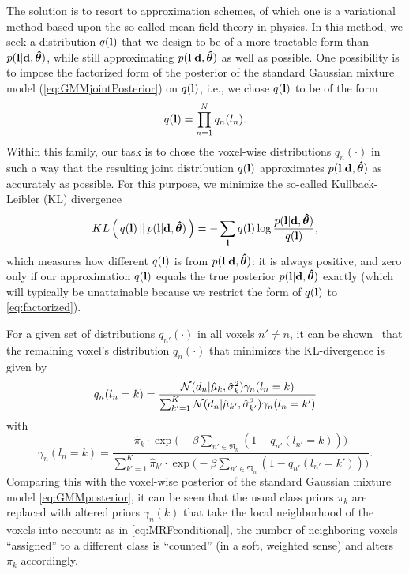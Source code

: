 \documentclass[10pt,twoside]{book}
\begin{document}
The solution is to resort to approximation schemes, of which one is a variational method based upon the so-called mean field theory in physics. In this method, we seek a distribution $q(\mathbf{l})$ that we design to be of a more tractable form than $p(\mathbf{l} | \mathbf{d}, {\mbox{\boldmath {${\hat{\theta}}$}}})$, while still approximating $p(\mathbf{l} | \mathbf{d}, {\mbox{\boldmath {${\hat{\theta}}$}}})$ as well as possible. One possibility is to impose the factorized form of the posterior of the standard Gaussian mixture model (\eqref{eq:GMMjointPosterior}) on $q(\mathbf{l})$, i.e., we chose $q(\mathbf{l})$ to be of the form
\begin{equation}
  q( \mathbf{l} ) = \prod_{n=1}^N q_n( l_n ).
  \label{eq:factorized}
\end{equation}
Within this family, our task is to chose the voxel-wise distributions $q_n(\cdot)$ in such a way that the resulting joint distribution $q(\mathbf{l})$ approximates $p(\mathbf{l} | \mathbf{d}, {\mbox{\boldmath {${\hat{\theta}}$}}})$ as accurately as possible. For this purpose, we minimize the so-called Kullback-Leibler (KL) divergence
\begin{equation}
  {KL}\left( \, q( \mathbf{l} ) \, || \, p(\mathbf{l} | \mathbf{d}, {\mbox{\boldmath {${\hat{\theta}}$}}}) \, \right) = - \sum_{\mathbf{l}} q( \mathbf{l} ) \log \frac{ p(\mathbf{l} | \mathbf{d}, {\mbox{\boldmath {${\hat{\theta}}$}}}) }{ q( \mathbf{l} ) },
  \label{eq:KL}
\end{equation}
which measures how different $q( \mathbf{l} )$ is from $p(\mathbf{l} | \mathbf{d}, {\mbox{\boldmath {${\hat{\theta}}$}}})$: it is always positive, and zero only if our approximation $q( \mathbf{l} )$ equals the true posterior $p(\mathbf{l} | \mathbf{d}, {\mbox{\boldmath {${\hat{\theta}}$}}})$ exactly (which will typically be unattainable because we restrict the form of $q( \mathbf{l} )$ to \eqref{eq:factorized}).

For a given set of distributions $q_{n'}( \cdot )$ in all voxels $n' \neq n$, it can be shown~\cite{Jaakkola} that the remaining voxel's distribution $q_n( \cdot )$ that minimizes the KL-divergence is given by
\begin{equation}
  q_n( l_n=k ) = \frac{ \N( d_n | \hat{\mu}_k, \hat{\sigma}_k^2 ) \gamma_n(l_n=k) }%
                                              { \sum_{k'=1}^K \N( d_n | \hat{\mu}_{k'}, \hat{\sigma}_{k'}^2 ) \gamma_n( l_n=k' ) }
  \label{eq:meanfield}
\end{equation}
with
\begin{equation}
  \gamma_n( l_n = k) = 
  \frac{ \hat{\pi}_{k} \cdot \exp\big( -\beta \sum_{n' \in \mathfrak{N}_n} ( 1 - q_{n'}( l_{n'} = k ) ) \big) }%
       { \sum_{k'=1}^K \hat{\pi}_{k'} \cdot \exp\big( -\beta \sum_{n' \in \mathfrak{N}_n} ( 1 - q_{n'}( l_{n'} = k' ) ) \big) }.
  \label{eq:meanfieldPrior}
\end{equation}
Comparing this with the voxel-wise posterior of the standard Gaussian mixture model \eqref{eq:GMMposterior}, it can be seen that the usual class priors $\pi_k$ are replaced with altered priors $\gamma_n(k)$ that take the local neighborhood of the voxels into account: as in \eqref{eq:MRFconditional}, the number of neighboring voxels ``assigned'' to a different class is ``counted'' (in a soft, weighted sense) and alters $\pi_k$ accordingly.
\end{document}
